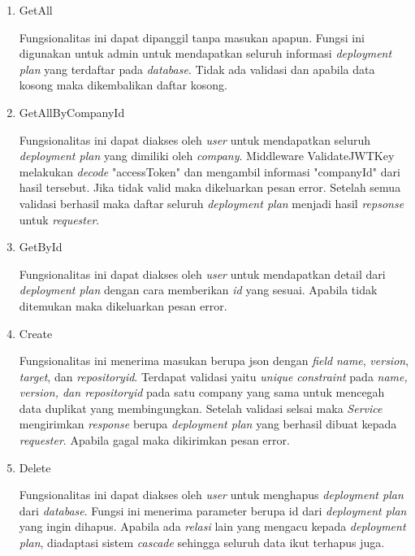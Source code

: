 \begin{enumerate}
  \item GetAll

        Fungsionalitas ini dapat dipanggil tanpa masukan apapun. Fungsi ini digunakan untuk admin untuk mendapatkan seluruh informasi \textit{deployment plan} yang terdaftar pada \textit{database}. Tidak ada validasi dan apabila data kosong maka dikembalikan daftar kosong.

  \item GetAllByCompanyId

        Fungsionalitas ini dapat diakses oleh \textit{user} untuk mendapatkan seluruh \textit{deployment plan} yang dimiliki oleh \textit{company}. Middleware ValidateJWTKey melakukan \textit{decode} "accessToken" dan mengambil informasi "companyId" dari hasil tersebut. Jika tidak valid maka dikeluarkan pesan error. Setelah semua validasi berhasil maka daftar seluruh \textit{deployment plan} menjadi hasil \textit{repsonse} untuk \textit{requester}.

  \item GetById

        Fungsionalitas ini dapat diakses oleh \textit{user} untuk mendapatkan detail dari \textit{deployment plan} dengan cara memberikan \textit{id} yang sesuai. Apabila tidak ditemukan maka dikeluarkan pesan error.

  \item Create

        Fungsionalitas ini menerima masukan berupa json dengan \textit{field} \textit{name}, \textit{version}, \textit{target}, dan \textit{repository\textunderscore id}. Terdapat validasi yaitu \textit{unique constraint} pada \textit{name, version, dan repository\textunderscore id} pada satu company yang sama untuk mencegah data duplikat yang membingungkan. Setelah validasi selsai maka \textit{Service} mengirimkan \textit{response} berupa \textit{deployment plan} yang berhasil dibuat kepada \textit{requester}. Apabila gagal maka dikirimkan pesan error.

  \item Delete

        Fungsionalitas ini dapat diakses oleh \textit{user} untuk menghapus \textit{deployment plan} dari \textit{database}. Fungsi ini menerima parameter berupa id dari \textit{deployment plan} yang ingin dihapus. Apabila ada \textit{relasi} lain yang mengacu kepada \textit{deployment plan}, diadaptasi sistem \textit{cascade} sehingga seluruh data ikut terhapus juga.


\end{enumerate}
